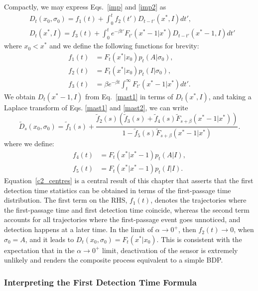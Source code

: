 Compactly, we may express Eqs.~\eqref{imp} and \eqref{imp2} as
\begin{align}
    &D_t(x_0, \sigma_0) = f_1(t) + \int_0^t f_2(t') D_{t-t'}(x^*,I)dt',    \label{mast1} \\
    &D_t(x^*, I) = f_3(t) + \int_0^t e^{-\beta t'}F_{t'}(x^*-1|x^*) D_{t-t'}(x^*-1,I) dt'
    \label{mast2}
\end{align}
where $x_0<x^*$ and we define the following functions for brevity:
\begin{align}
 f_{1}(t) &= F_t(x^*|x_0) p_{t}(A|\sigma_0),\\ f_{2}(t) &= F_t(x^*|x_0)p_{t}(I|\sigma_0),  \\
 f_{3}(t) &= \beta e^{-\beta t} \int_t^{\infty}F_{t'}(x^*-1|x^*)dt'.
\end{align}
We obtain $D_t(x^*-1,I)$ from Eq.~\eqref{mast1} in terms of $D_t(x^*,I)$, and taking a Laplace transform of Eqs. \eqref{mast1} and \eqref{mast2}, we can write
\begin{equation}
    \widetilde{D}_s(x_0, \sigma_0) = \widetilde{f}_1(s) + \frac{ \widetilde{f}_2(s)\left(\widetilde{f}_3(s)+\widetilde{f}_4(s)\widetilde{F}_{s+\beta}(x^*-1|x^*)\right)}{1-\widetilde{f}_5(s)\widetilde{F}_{s+\beta}(x^*-1|x^*)}.
    \label{c2_centres}
\end{equation}
where we define:
\begin{align}
 f_{4}(t) &= F_{t}(x^*|x^*-1)p_t(A|I), \\
 f_{5}(t) &= F_{t}(x^*|x^*-1)p_t(I|I).
\end{align}
Equation~\ref{c2_centres} is a central result of this chapter that asserts that the first detection time statistics can be obtained in terms of the first-passage time distribution. The first term on the RHS, $f_1(t)$, denotes the trajectories where the first-passage time and first detection time coincide, whereas the second term accounts for all trajectories where the first-passage event goes unnoticed, and detection happens at a later time. In the limit of $\alpha \to 0^+$, then $f_{2}(t) \to 0$, when $\sigma_0=A$, and it leads to $D_{t}(x_0,\sigma_0) = F_t(x^*|x_0)$. This is consistent with the expectation that in the $\alpha \to 0^+$ limit, deactivation of the sensor is extremely unlikely and renders the composite process equivalent to a simple BDP.  

\subsubsection*{Interpreting the First Detection Time Formula}

